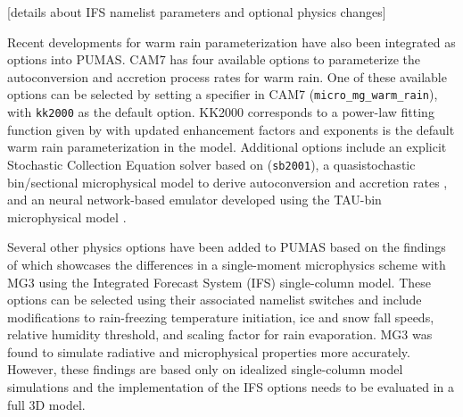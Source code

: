 \documentclass[draft]{agujournal2019}
\begin{document}
 [details about IFS namelist parameters and optional physics changes]

 Recent developments for warm rain parameterization have also been integrated as options into PUMAS. CAM7 has four available options to parameterize the autoconversion and accretion process rates for warm rain. %
 One of these available options can be selected by setting a specifier in CAM7 (\verb+micro_mg_warm_rain+), with \verb+kk2000+ as the default option. KK2000 corresponds to a power-law fitting function given by  with updated enhancement factors and exponents is the default warm rain parameterization in the model. Additional options include an explicit Stochastic Collection Equation solver based on  (\verb+sb2001+), a quasistochastic bin/sectional microphysical model to derive autoconversion and accretion rates \cite<TAU-bin,>{tau2011}, and an neural network-based emulator developed using the TAU-bin microphysical model \cite<emulated,>{emulated2021}.
 
 Several other physics options have been added to PUMAS based on the findings of  which showcases the differences in a single-moment microphysics scheme with MG3 using the Integrated Forecast System (IFS) single-column model. These options can be selected using their associated namelist switches and include modifications to rain-freezing temperature initiation, ice and snow fall speeds, relative humidity threshold, and scaling factor for rain evaporation. MG3 was found to simulate radiative and microphysical properties more accurately. However, these findings are based only on idealized single-column model simulations and the implementation of the IFS options needs to be evaluated in a full 3D model.
\end{document}
